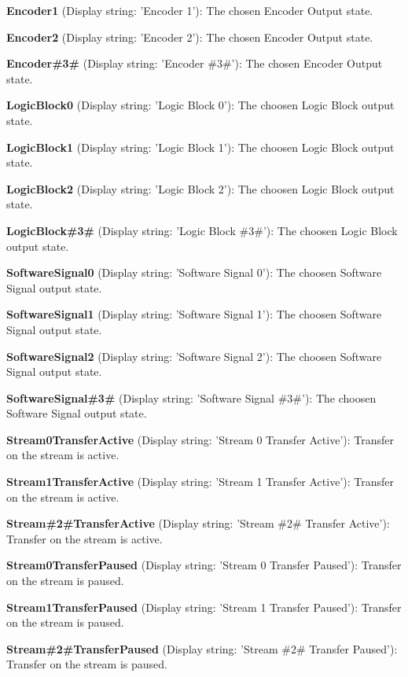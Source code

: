 \begin{DoxyItemize}
\item {\bfseries Encoder1} (Display string\+: 'Encoder 1')\+: The chosen Encoder Output state.
\item {\bfseries Encoder2} (Display string\+: 'Encoder 2')\+: The chosen Encoder Output state.
\item {\bfseries Encoder\#3\#} (Display string\+: 'Encoder \#3\#')\+: The chosen Encoder Output state.
\item {\bfseries Logic\+Block0} (Display string\+: 'Logic Block 0')\+: The choosen Logic Block output state.
\item {\bfseries Logic\+Block1} (Display string\+: 'Logic Block 1')\+: The choosen Logic Block output state.
\item {\bfseries Logic\+Block2} (Display string\+: 'Logic Block 2')\+: The choosen Logic Block output state.
\item {\bfseries Logic\+Block\#3\#} (Display string\+: 'Logic Block \#3\#')\+: The choosen Logic Block output state.
\item {\bfseries Software\+Signal0} (Display string\+: 'Software Signal 0')\+: The choosen Software Signal output state.
\item {\bfseries Software\+Signal1} (Display string\+: 'Software Signal 1')\+: The choosen Software Signal output state.
\item {\bfseries Software\+Signal2} (Display string\+: 'Software Signal 2')\+: The choosen Software Signal output state.
\item {\bfseries Software\+Signal\#3\#} (Display string\+: 'Software Signal \#3\#')\+: The choosen Software Signal output state.
\item {\bfseries Stream0\+Transfer\+Active} (Display string\+: 'Stream 0 Transfer Active')\+: Transfer on the stream is active.
\item {\bfseries Stream1\+Transfer\+Active} (Display string\+: 'Stream 1 Transfer Active')\+: Transfer on the stream is active.
\item {\bfseries Stream\#2\#Transfer\+Active} (Display string\+: 'Stream \#2\# Transfer Active')\+: Transfer on the stream is active.
\item {\bfseries Stream0\+Transfer\+Paused} (Display string\+: 'Stream 0 Transfer Paused')\+: Transfer on the stream is paused.
\item {\bfseries Stream1\+Transfer\+Paused} (Display string\+: 'Stream 1 Transfer Paused')\+: Transfer on the stream is paused.
\item {\bfseries Stream\#2\#Transfer\+Paused} (Display string\+: 'Stream \#2\# Transfer Paused')\+: Transfer on the stream is paused.

\end{DoxyItemize}
